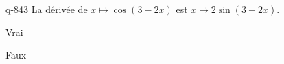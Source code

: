 \begin{truefalse}{q-843}
La dérivée de $x\mapsto \cos(3-2x)$ est $x\mapsto 2\sin(3-2x)$.
\item* Vrai
\item Faux
\end{truefalse}

